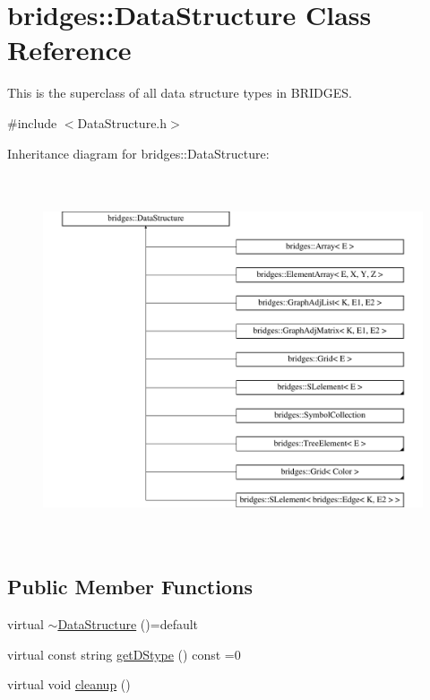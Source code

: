 \hypertarget{classbridges_1_1_data_structure}{}\section{bridges\+:\+:Data\+Structure Class Reference}
\label{classbridges_1_1_data_structure}


This is the superclass of all data structure types in B\+R\+I\+D\+G\+E\+S.  




{\ttfamily \#include $<$Data\+Structure.\+h$>$}

Inheritance diagram for bridges\+:\+:Data\+Structure\+:\begin{figure}[H]
\begin{center}
\leavevmode
\includegraphics[height=10.883392cm]{classbridges_1_1_data_structure}
\end{center}
\end{figure}
\subsection*{Public Member Functions}
\begin{DoxyCompactItemize}
\item 
virtual \hyperlink{classbridges_1_1_data_structure_afd70a1ae5c2578d80a441714f95f9401}{$\sim$\+Data\+Structure} ()=default
\item 
virtual const string \hyperlink{classbridges_1_1_data_structure_ab6973cdb2a22b7e664b895f1f9c8ad54}{get\+D\+Stype} () const  =0
\item 
virtual void \hyperlink{classbridges_1_1_data_structure_ac3ad75810fd77f0ad35b9b5123d2c8f8}{cleanup} ()
\end{DoxyCompactItemize}
